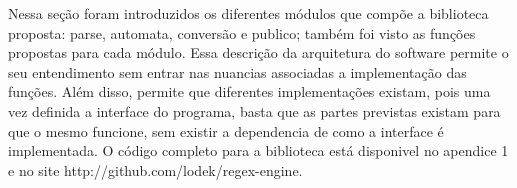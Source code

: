 Nessa seção foram introduzidos os diferentes módulos que compõe a biblioteca proposta: parse, automata, conversão e publico; também foi visto as funções propostas para cada módulo.
Essa descrição da arquitetura do software permite o seu entendimento sem entrar nas nuancias associadas a implementação das funções.
Além disso, permite que diferentes implementações existam, pois uma vez definida a interface do programa, basta que as partes previstas existam para que o mesmo funcione, sem existir a dependencia de como a interface é implementada.
O código completo para a biblioteca está disponivel no apendice 1 e no site http://github.com/lodek/regex-engine.
